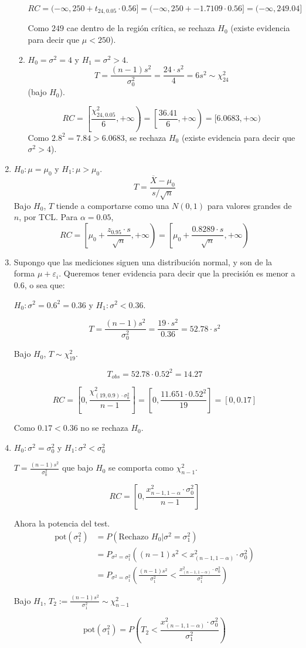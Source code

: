 \begin{enumerate}
\begin{enumerate}
				$$RC = (-\infty, 250 + t_{24,0.05}\cdot 0.56] = (-\infty, 250 + -1.7109\cdot 0.56] = (-\infty, 249.04]$$
				
				Como $249$ cae dentro de la región crítica, se rechaza $H_0$ (existe evidencia para decir que $\mu < 250$).
			\item
				$H_0 = \sigma^2 = 4$ y $H_1 = \sigma^2 > 4$.
				$$T = \frac{(n-1)s^2}{\sigma_0^2} = \frac{24\cdot s^2}{4} = 6s^2 \sim \chi^2_{24}$$ (bajo $H_0$).
				
				$$RC = \left[\frac{\chi^2_{24, 0.05}}{6}, +\infty\right) = \left[\frac{36.41}{6}, +\infty\right) = [6.0683, +\infty)$$
				Como $2.8^2 = 7.84 > 6.0683$, se rechaza $H_0$ (existe evidencia para decir que $\sigma^2 > 4$).
		\end{enumerate}
		
	\item
		$H_0: \mu = \mu_0$ y $H_1: \mu > \mu_0$.
		$$T=\frac{\overline{X}-\mu_0}{s/\sqrt{n}}$$
		Bajo $H_0$, $T$ tiende a comportarse como una $N(0,1)$ para valores grandes de $n$, por TCL.
		Para $\alpha = 0.05$,
		$$RC = \left[\mu_0 + \frac{z_{0.95}\cdot s}{\sqrt{n}} , +\infty\right) = \left[\mu_0 + \frac{0.8289\cdot s}{\sqrt{n}}, +\infty\right)$$
		
	\item
		Supongo que las mediciones siguen una distribución normal, y son de la forma $\mu + \varepsilon_i$. Queremos tener evidencia para decir que la precisión es menor a $0.6$, o sea que:
		
		$H_0: \sigma^2 = 0.6^2 = 0.36$ y $H_1: \sigma^2 < 0.36$.
		
		$$T = \frac{(n-1)s^2}{\sigma_0^2} = \frac{19\cdot s^2}{0.36} = 52.78 \cdot s^2$$
		
		Bajo $H_0$, $T\sim \chi^2_{19}$.
		
		$$T_{obs} = 52.78\cdot 0.52^2 = 14.27$$
		
		$$RC = \left[0, \frac{\chi^2_{(19, 0.9)\cdot\sigma_0^2}}{n-1}\right] = \left[0, \frac{11.651\cdot 0.52^2}{19}\right] = [0, 0.17]$$
		
		Como $0.17 < 0.36$ no se rechaza $H_0$.
	\item
		$H_0: \sigma^2 = \sigma_0^2$ y $H_1: \sigma^2 < \sigma_0^2$
		
		$T= \frac{(n-1)s^2}{\sigma_0^2}$ que bajo $H_0$ se comporta como $\chi^2_{n-1}$.
		
		$$RC = \left[0, \frac{x^2_{n-1, 1-\alpha}\cdot \sigma_0^2}{n-1}\right]$$
		
		Ahora la potencia del test.
		\begin{align*}
			\text{pot}(\sigma_1^2)	& = P(\text{Rechazo }H_0 | \sigma^2 = \sigma_1^2)								\\
									& = P_{\sigma^2 = \sigma_1^2}((n-1)s^2 < x^2_{(n-1, 1-\alpha)}\cdot \sigma_0^2)	\\
									& = P_{\sigma^2 = \sigma_1^2}\left(\frac{(n-1)s^2}{\sigma_1^2} < \frac{x^2_{(n-1, 1-\alpha)}\cdot \sigma_0^2}{\sigma_1^2}\right)
		\end{align*}
		
		Bajo $H_1$, $T_2:= \frac{(n-1)s^2}{\sigma_1^2} \sim \chi^2_{n-1}$
		
		$$\text{pot}(\sigma_1^2) = P\left(T_2 < \frac{x^2_{(n-1, 1-\alpha)}\cdot \sigma_0^2}{\sigma_1^2}\right)$$
\end{enumerate}
